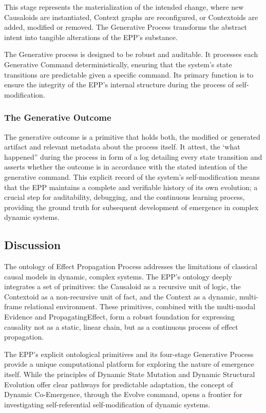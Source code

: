 This stage represents the materialization of the intended change, where new Causaloids are instantiated, Context graphs are reconfigured, or Contextoids are added, modified or removed. The Generative Process transforms the abstract intent into tangible alterations of the EPP's substance.

The Generative process is designed to be robust and auditable. It processes each Generative Command deterministically, ensuring that the system's state transitions are predictable given a specific command. Its primary function is to ensure the integrity of the EPP's internal structure during the process of self-modification. 


\subsubsection{The Generative Outcome}
\label{sec:ontology_emgerence_gen_outcome}

The generative outcome is a primitive that holds both, the modified or generated artifact and relevant metadata about the process itself. It attest, the ‘what happened” during the process in form of a log detailing every state transition and asserts whether the outcome is in accordance with the stated intention of the generative command. This explicit record of the system's self-modification means that the EPP maintains a complete and verifiable history of its own evolution; a crucial step for auditability, debugging, and the continuous learning process, providing the ground truth for subsequent development of emergence in complex dynamic systems.

\newpage

\subsection{Discussion}
\label{sec:ontology_discussion}

The ontology  of Effect Propagation Process addresses the limitations of classical causal models in dynamic, complex systems. The EPP's ontology deeply integrates a set of primitives: the Causaloid as a recursive unit of logic, the Contextoid as a non-recursive unit of fact, and the Context as a dynamic, multi-frame relational environment. These primitives, combined with the multi-modal Evidence and PropagatingEffect, form a robust foundation for expressing causality not as a static, linear chain, but as a continuous process of effect propagation. 

The EPP's explicit ontological primitives and its four-stage Generative Process provide a  unique computational platform for exploring the nature of emergence itself. While the  principles of Dynamic State Mutation and Dynamic Structural Evolution offer clear pathways for  predictable adaptation, the concept of Dynamic Co-Emergence, through the Evolve command, opens a frontier for investigating self-referential self-modification of dynamic systems.

